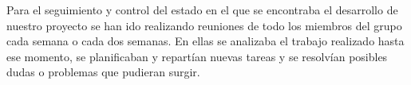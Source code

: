 Para el seguimiento y control del estado en el que se encontraba el desarrollo de nuestro proyecto se han ido realizando reuniones de todo los miembros del grupo cada semana o cada dos semanas. En ellas se analizaba el trabajo realizado hasta ese momento, se planificaban y repartían nuevas tareas y se resolvían posibles dudas o problemas que pudieran surgir.
